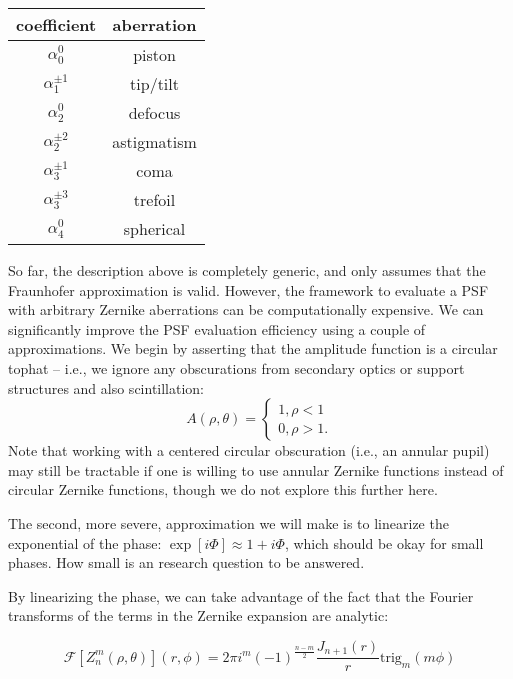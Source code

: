 \documentclass{article}
\newcommand{\trig}{\mathrm{trig}}
\begin{document}
\begin{center}
  \begin{tabular}{cc}
    coefficient & aberration \\
    \hline
    $\alpha_0^0$ & piston \\
    $\alpha_1^{\pm 1}$ & tip/tilt \\
    $\alpha_2^0$ & defocus \\
    $\alpha_2^{\pm 2}$ & astigmatism \\
    $\alpha_3^{\pm 1}$ & coma \\
    $\alpha_3^{\pm 3}$ & trefoil \\
    $\alpha_4^0$ & spherical 
  \end{tabular}
\end{center}

So far, the description above is completely generic, and only assumes that the Fraunhofer approximation is valid.  However, the framework to evaluate a PSF with arbitrary Zernike aberrations can be computationally expensive.  We can significantly improve the PSF evaluation efficiency using a couple of approximations.  We begin by asserting that the amplitude function is a circular tophat -- i.e., we ignore any obscurations from secondary optics or support structures and also scintillation:
\begin{equation}
  A(\rho, \theta) =
  \begin{cases}
    1, \rho < 1 \\
    0, \rho > 1.
  \end{cases}
\end{equation}
Note that working with a centered circular obscuration (i.e., an annular pupil) may still be tractable if one is willing to use annular Zernike functions instead of circular Zernike functions, though we do not explore this further here.

The second, more severe, approximation we will make is to linearize the exponential of the phase: $\exp[i \Phi] \approx 1+i \Phi$, which should be okay for small phases.  How small is an research question to be answered.

By linearizing the phase, we can take advantage of the fact that the Fourier transforms of the terms in the Zernike expansion are analytic:

\begin{equation}
  \mathcal{F}\left[Z_n^m(\rho, \theta)\right](r, \phi) = 2 \pi i^m (-1)^{\frac{n-m}{2}} \frac{J_{n+1}(r)}{r}\trig_m(m \phi)
\end{equation}
\end{document}
